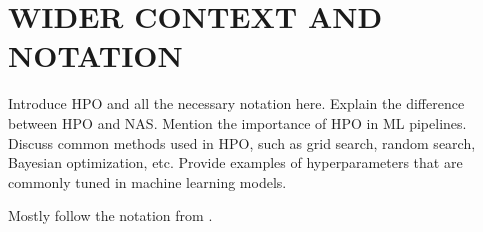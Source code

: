 \section{\uppercase{Wider context and Notation}}

Introduce HPO and all the necessary notation here. Explain the difference between HPO and NAS\@. Mention the importance of HPO in ML pipelines. Discuss common methods used in HPO, such as grid search, random search, Bayesian optimization, etc. Provide examples of hyperparameters that are commonly tuned in machine learning models.

Mostly follow the notation from \cite{bischl_hyperparameter_2023}.
